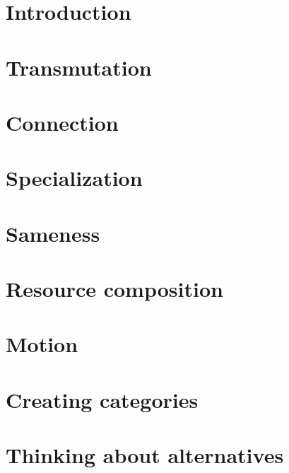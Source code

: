 \documentclass[paper=6in:9in,pagesize=pdftex,
 headinclude=off,footinclude=on,11pt,twoside]{scrbook}
\begin{document}

\setcounter{tocdepth}{1}
\tableofcontents

\chapter{Introduction}

\clearpage

\chapter{Transmutation}

\clearpage

\chapter{Connection}

\clearpage

\chapter{Specialization}

\clearpage

\chapter{Sameness}

\clearpage

\chapter{Resource composition}

\clearpage

\chapter{Motion}

\clearpage

\chapter{Creating categories}

\clearpage

\chapter{Thinking about alternatives}

\clearpage
\end{document}
